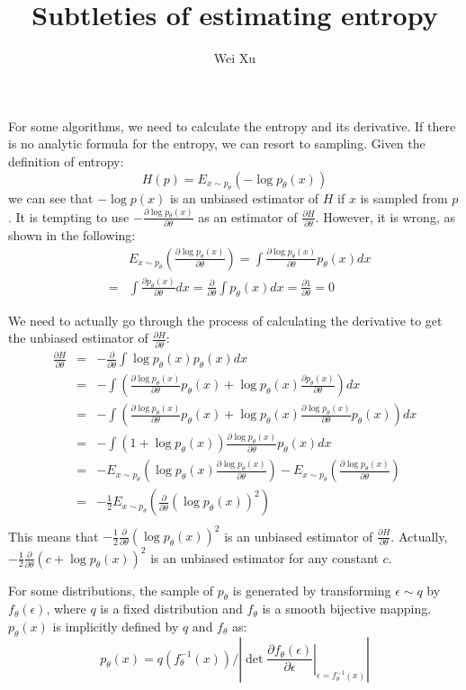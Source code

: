 \documentclass{article}
\title{Subtleties of estimating entropy}
\author{Wei Xu}
\newcommand{\pian}[2]{\frac{\partial #1}{\partial #2}}
\begin{document}
	\maketitle

For some algorithms, we need to calculate the entropy and its derivative. If there is no analytic formula for the entropy, we can resort to sampling. Given the definition of entropy:
\begin{equation}
H(p) = E_{x\sim p_\theta}(-\log p_\theta(x))
\end{equation}
we can see that $-\log p(x)$ is an unbiased estimator of $H$ if $x$ is sampled from $p$. It is tempting to use $-\pian{\log p_\theta(x)}{\theta}$ as an estimator of $\pian{H}{\theta}$. However, it is wrong, as shown in the following: 
\begin{eqnarray*}
&&	E_{x\sim p_\theta}\left(\pian{\log p_\theta(x)}{\theta}\right) = \int \pian{\log p_\theta(x)}{\theta} p_\theta(x) dx \\
&=& \int \pian{p_\theta(x)}{\theta} dx = \pian{}{\theta} \int p_\theta(x) dx = \pian{1}{\theta} = 0
\end{eqnarray*}

We need to actually go through the process of calculating the derivative to get the unbiased estimator
of $\pian{H}{\theta}$:
\begin{eqnarray*}
\pian{H}{\theta}&=&-\pian{}{\theta}\int \log p_\theta(x) p_\theta(x) dx \\
&=& - \int \left(\pian{\log p_\theta(x)}{\theta}p_\theta(x) + \log p_\theta(x) \pian{p_\theta(x)}{\theta}\right) dx \\
&=& - \int \left(\pian{\log p_\theta(x)}{\theta}p_\theta(x) + \log p_\theta(x) \pian{\log p_\theta(x)}{\theta} p_\theta(x)\right) dx \\
&=& - \int (1+\log p_\theta(x))\pian{\log p_\theta(x)}{\theta} p_\theta(x) dx \\
&=& -E_{x\sim p_\theta}\left(\log p_\theta(x)\pian{\log p_\theta(x)}{\theta}\right) -E_{x\sim p_\theta}\left(\pian{\log p_\theta(x)}{\theta}\right) \\
&=& -\frac{1}{2}E_{x\sim p_\theta}\left(\pian{}{\theta}(\log p_\theta(x))^2\right) \\
\end{eqnarray*}
This means that $-\frac{1}{2}\pian{}{\theta}(\log p_\theta(x))^2$ is an unbiased estimator of $\pian{H}{\theta}$. Actually, $-\frac{1}{2}\pian{}{\theta}(c+\log p_\theta(x))^2$ is an unbiased
estimator for any constant $c$.

For some distributions, the sample of $p_\theta$ is generated by transforming $\epsilon \sim q$ by $f_\theta(\epsilon)$, where $q$ is a fixed distribution and $f_\theta$ is a smooth bijective mapping. $p_\theta(x)$ is implicitly defined by $q$ and $f_\theta$ as:
\[ p_\theta(x) = q(f_\theta^{-1}(x)) / \left|\det \left.\pian{f_\theta(\epsilon)}{\epsilon}\right|_{\epsilon=f_\theta^{-1}(x)}\right|\]
\end{document}
